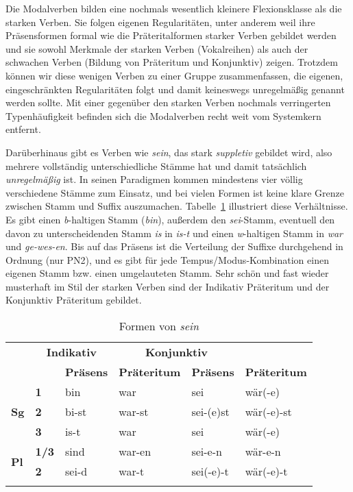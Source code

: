 Die Modalverben bilden eine nochmals wesentlich kleinere Flexionsklasse als die starken Verben.
Sie folgen eigenen Regularitäten, unter anderem weil ihre Präsensformen formal wie die Präteritalformen starker Verben gebildet werden und sie sowohl Merkmale der starken Verben (Vokalreihen) als auch der schwachen Verben (Bildung von Präteritum und Konjunktiv) zeigen.
Trotzdem können wir diese wenigen Verben zu einer Gruppe zusammenfassen, die eigenen, eingeschränkten Regularitäten folgt und damit keineswegs unregelmäßig genannt werden sollte.
Mit einer gegenüber den starken Verben nochmals verringerten Typenhäufigkeit befinden sich die Modalverben recht weit vom Systemkern entfernt.

Darüberhinaus gibt es Verben wie \textit{sein}, das stark \textit{suppletiv} gebildet wird, also mehrere vollständig unterschiedliche Stämme hat und damit tatsächlich \textit{unregelmäßig} ist.
In seinen Paradigmen kommen mindestens vier völlig verschiedene Stämme zum Einsatz, und bei vielen Formen ist keine klare Grenze zwischen Stamm und Suffix auszumachen.
Tabelle~\ref{tab:sein} illustriert diese Verhältnisse.
Es gibt einen \textit{b}-haltigen Stamm (\textit{bin}), außerdem den \textit{sei}-Stamm, eventuell den davon zu unterscheidenden Stamm \textit{is} in \textit{is-t} und einen \textit{w}-haltigen Stamm in \textit{war} und \textit{ge-wes-en}.
Bis auf das Präsens ist die Verteilung der Suffixe durchgehend in Ordnung (nur PN2), und es gibt für jede Tempus\slash Modus-Kombination einen eigenen Stamm bzw. einen umgelauteten Stamm.
Sehr schön und fast wieder musterhaft im Stil der starken Verben sind der Indikativ Präteritum und der Konjunktiv Präteritum gebildet.

\begin{table}
  \centering
  \begin{tabular}{llllll}
    \lsptoprule
    \multicolumn{2}{c}{} & \multicolumn{2}{c}{\textbf{Indikativ}} & \multicolumn{2}{c}{\textbf{Konjunktiv}} \\
    \multicolumn{2}{c}{} & \textbf{Präsens} & \textbf{Präteritum} & \textbf{Präsens} & \textbf{Präteritum} \\
    \midrule
    \multirow{3}{*}{\textbf{Sg}} & \textbf{1} & bin & war & sei & wär(-e) \\
    & \textbf{2} & bi-st & war-st & sei-(e)st & wär(-e)-st \\
    & \textbf{3} & is-t & war & sei & wär(-e) \\
     \multirow{2}{*}{\textbf{Pl}} & \textbf{1/3} & sind & war-en & sei-e-n & wär-e-n \\
     & \textbf{2} & sei-d & war-t & sei(-e)-t & wär(-e)-t \\
    \lspbottomrule
  \end{tabular}
  \caption{Formen von \textit{sein}}
  \label{tab:sein}
\end{table}

